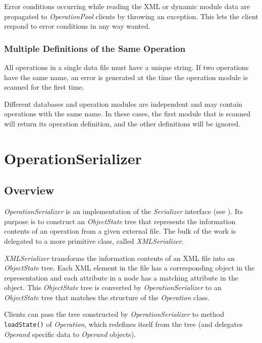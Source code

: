 \documentclass[a4paper,twoside]{tce}
\begin{document}
Error conditions occurring while reading the XML or dynamic module data are
propagated to \emph{OperationPool} clients by throwing an exception.  This
lets the client respond to error conditions in any way wanted.

\subsubsection{Multiple Definitions of the Same Operation}

All operations in a single data file must have a unique string.  If two
operations have the same name, an error is generated at the time the
operation module is scanned for the first time.

Different databases and operation modules are independent and may
contain operations with the same name.  In these cases, the first module
that is scanned will return its operation definition, and the other
definitions will be ignored.


\section{OperationSerializer}
\label{sec:operationSerializer}

\subsection{Overview}

\emph{OperationSerializer} is an implementation of the \emph{Serializer}
interface (see \cite{ToolkitDesign}).  Its purpose is to construct an
\emph{ObjectState} tree that represents the information contents of an
operation from a given external file.  The bulk of the work is delegated to
a more primitive class, called \emph{XMLSerializer}.

\emph{XMLSerializer} transforms the information contents of an XML file into
an \emph{ObjectState} tree.  Each XML element in the file has a
corresponding object in the representation and each attribute in a node has
a matching attribute in the object. This \emph{ObjectState} tree is
converted by \emph{OperationSerializer} to an \emph{ObjectState} tree that
matches the structure of the \emph{Operation} class.

Clients can pass the tree constructed by \emph{OperationSerializer} to
method \verb|loadState()| of \emph{Operation}, which redefines itself from
the tree (and delegates \emph{Operand} specific data to \emph{Operand}
objects).
\end{document}
